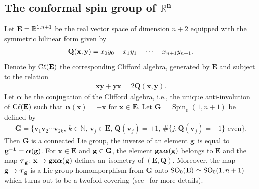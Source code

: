 \documentclass[pdftex]{sigma}
\DeclareMathOperator{\cl}{C\ell} %
\DeclareMathOperator{\Spin}{Spin}
\DeclareMathOperator{\SO}{SO}
\numberwithin{equation}{section}
\begin{document}
\subsection[The conformal spin group of Rn]{The conformal spin group of $\boldsymbol{\mathbb{R}^n}$}

Let ${\bf E} = \mathbb R^{1,n+1}$ be the real vector space of dimension $n+2$ equipped with the symmetric bilinear form given by
\begin{gather*}
{\bf Q}( {\mathbf x,\mathbf y }) = x_0y_0-x_1y_1-\dots -x_{n+1}y_{n+1} .
\end{gather*}
Denote by $\cl(\bf E)$ the corresponding Clifford algebra, generated by $\mathbf E$ and subject to the relation
\begin{gather*}
\mathbf x\mathbf y+ \mathbf y\mathbf x= 2\mathbf Q(\mathbf x, \mathbf y) .
\end{gather*}
Let $\boldsymbol \alpha$ be the conjugation of the Clifford algebra, i.e., the unique anti-involution of $\cl(\bf E)$ such that $ \boldsymbol \alpha(\mathbf x) = -\mathbf x$ for $\mathbf x\in\mathbf E$.
Let
$ {\mathbf G} = \Spin_0(1,n+1)$ be defined by
\begin{gather*}
\mathbf G=\big\{\mathbf v_1 \mathbf v_2\cdots \mathbf v_{2k},\,k\in \mathbb N,\, \mathbf v_j\in \mathbf E,\, \mathbf Q(\mathbf v_j) = \pm 1,\, \#\{j,\mathbf Q(\mathbf v_j) = -1\} \text{ even} \big\} .
\end{gather*}
Then $ {\mathbf G}$ is a connected Lie group,
 the inverse of an element $\bf g$ is equal to $\bf g^{-1} = \boldsymbol \alpha (g)$. For $\mathbf x\in \mathbf E$ and $\bf g\in \mathbf G$, the element $\bf g\mathbf x \boldsymbol \alpha(\bf g)$ belongs to $\mathbf E$ and the map $\boldsymbol \tau_{\bf g} \colon\mathbf x \mapsto\bf g\mathbf x \boldsymbol \alpha(\bf g)$ defines an~isometry of $(\mathbf E,\mathbf Q)$. Moreover, the map $ \bf g\mapsto\boldsymbol \tau_{\bf g}$ is a Lie group homomporphism from $\mathbf G$ onto $\SO_0({\bf E})\simeq \SO_0(1,n+1)$ which turns out to be a twofold covering (see~\cite{dss} for more details).
\end{document}
